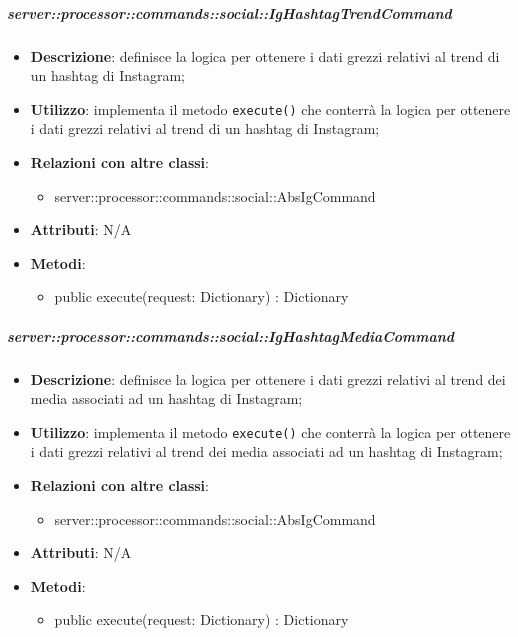         \subparagraph{server::processor::commands::social::IgHashtagTrendCommand} %
        \label{subp:bdsm_app_server_processor_commands_social_ighashtagtrendcommand}
        \begin{itemize}
          \item \textbf{Descrizione}: definisce la logica per ottenere i dati grezzi relativi al trend di un hashtag di Instagram;
          \item \textbf{Utilizzo}: implementa il metodo \texttt{execute()} che conterrà la logica per ottenere i dati grezzi relativi al trend di un hashtag di Instagram;
          \item \textbf{Relazioni con altre classi}:
            \begin{itemize}
              \item server::processor::commands::social::AbsIgCommand
            \end{itemize}
			\item \textbf{Attributi}: N/A
			\item \textbf{Metodi}:
        	\begin{itemize}
          		\item public execute(request: Dictionary) : Dictionary
        	\end{itemize}
        \end{itemize}

        \subparagraph{server::processor::commands::social::IgHashtagMediaCommand} %
        \label{subp:bdsm_app_server_processor_commands_social_twhashtagmediacommand}
        \begin{itemize}
          \item \textbf{Descrizione}: definisce la logica per ottenere i dati grezzi relativi al trend dei media associati ad un hashtag di Instagram;
          \item \textbf{Utilizzo}: implementa il metodo \texttt{execute()} che conterrà la logica per ottenere i dati grezzi relativi al trend dei media associati ad un hashtag di Instagram;
          \item \textbf{Relazioni con altre classi}:
            \begin{itemize}
              \item server::processor::commands::social::AbsIgCommand
            \end{itemize}
			\item \textbf{Attributi}: N/A
			\item \textbf{Metodi}:
        	\begin{itemize}
          		\item public execute(request: Dictionary) : Dictionary
        	\end{itemize}
        \end{itemize}

